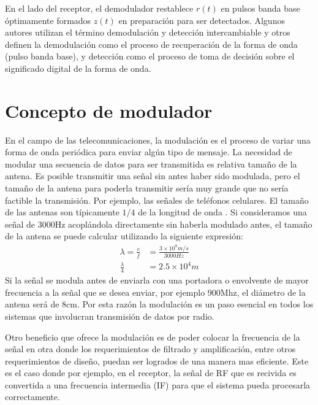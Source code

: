 En el lado del receptor, el demodulador restablece $r(t)$ en pulsos banda base
\'optimamente formados $z(t)$ en preparaci\'on para ser detectados. Algunos
autores utilizan el t\'ermino demodulaci\'on y detecci\'on intercambiable y
otros definen la demodulaci\'on como el proceso de recuperaci\'on de la forma de
onda (pulso banda base), y detecci\'on como el proceso de toma de decisi\'on
sobre el significado digital de la forma de onda.

\section{Concepto de modulador}

En el campo de las telecomunicaciones, la modulaci\'on es el proceso de variar
una forma de onda peri\'odica para enviar alg\'un tipo de mensaje. La necesidad
de modular una secuencia de datos para ser transmitida es relativa tama\~no de
la antena. Es posible transmitir una se\~nal sin antes haber sido modulada, pero
el tama\~no de la antena para poderla transmitir ser\'ia muy grande que no
ser\'ia factible la transmisi\'on. Por ejemplo, las se\~nales de tel\'efonos
celulares. El tama\~no de las antenas son t\'ipicamente $1/4$ de la longitud de onda
\cite{sklar}. Si consideramos una se\~nal de 3000Hz acopl\'andola directamente
sin haberla modulado antes, el tama\~no de la antena se puede calcular
utilizando la siguiente expresi\'on:
\begin{equation}
\begin{aligned}
\lambda=\frac{c}{f}&=\frac{3\times10^8m/s}{3000Hz}\\
\frac{\lambda}{4}&=2.5\times10^4m
\end{aligned}
\end{equation}
Si la se\~nal se modula antes de enviarla con una portadora o envolvente de
mayor frecuencia a la se\~nal que se desea enviar, por ejemplo 900Mhz, el
di\'ametro de la antena ser\'a de 8cm. Por esta raz\'on la modulaci\'on es un
paso esencial en todos los sistemas que involucran transmisi\'on de datos por
radio.

Otro beneficio que ofrece la modulaci\'on es de poder colocar la frecuencia de la se\~nal en otra
donde los requerimientos de filtrado y amplificaci\'on, entre otros requerimientos de dise\~no,
puedan ser logrados de una manera mas eficiente. Este es el caso donde por ejemplo, en el receptor,
la se\~nal de RF que es recivida es convertida a una frecuencia intermedia (IF) para que el sistema
pueda procesarla correctamente.

